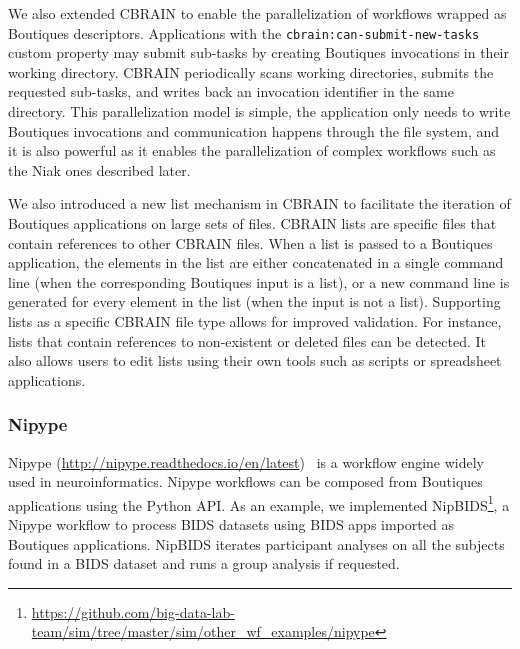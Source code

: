 \documentclass[a4paper,num-refs]{oup-contemporary}
\newcommand{\boutiques}{Boutiques\xspace}
\begin{document}
We also extended CBRAIN to enable the parallelization of workflows
wrapped as \boutiques descriptors. Applications with the
\texttt{cbrain:can-submit-new-tasks} custom property may submit sub-tasks by
creating \boutiques invocations in their working directory. CBRAIN
periodically scans working directories, submits the requested
sub-tasks, and writes back an invocation identifier in the same
directory. This parallelization model is simple, the application only
needs to write \boutiques invocations and communication happens
through the file system, and it is also powerful as it enables the
parallelization of complex workflows such as the Niak ones
described later. 

We also introduced a new list mechanism in CBRAIN to facilitate the
iteration of \boutiques applications on large sets of files. CBRAIN
lists are specific files that contain references to other CBRAIN
files. When a list is passed to a \boutiques application, the elements
in the list are either concatenated in a single command line (when the
corresponding \boutiques input is a list), or a new command line is
generated for every element in the list (when the input is not a
list). Supporting lists as a specific CBRAIN file type allows for
improved validation. For instance, lists that contain references to
non-existent or deleted files can be detected. It also allows users to
edit lists using their own tools such as scripts or spreadsheet
applications.

\subsubsection{Nipype}
Nipype
(\url{http://nipype.readthedocs.io/en/latest})~\cite{gorgolewski2011nipype}
is a workflow engine widely used in neuroinformatics. Nipype workflows
can be composed from \boutiques applications using the Python API. As
an example, we implemented
NipBIDS\footnote{\url{https://github.com/big-data-lab-team/sim/tree/master/sim/other_wf_examples/nipype}},
a Nipype workflow to process BIDS datasets using BIDS apps imported as
\boutiques applications. NipBIDS iterates participant analyses on all
the subjects found in a BIDS dataset and runs a group analysis if
requested.
\end{document}
